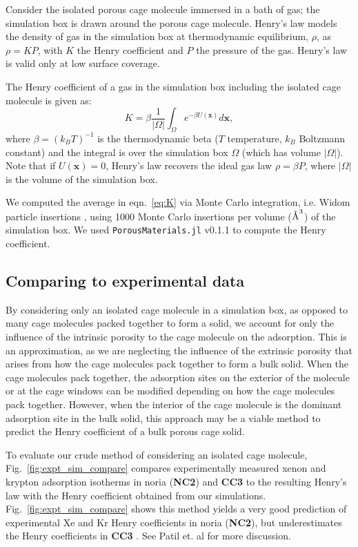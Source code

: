 \documentclass[journal=jacsat,manuscript=article]{achemso}
\newcommand{\angstrom}{\mbox{\normalfont\AA}}
\begin{document}
Consider the isolated porous cage molecule immersed in a bath of gas; the simulation box is drawn around the porous cage molecule. Henry's law models the density of gas in the simulation box at thermodynamic equilibrium, $\rho $, as $\rho=K P$, with $K$ the Henry coefficient and $P$ the pressure of the gas. Henry's law is valid only at low surface coverage.

The Henry coefficient of a gas in the simulation box including the isolated cage molecule is given as:
\begin{equation}
K = \beta \frac{1}{|\Omega|} \int_\Omega e^{-\beta U(\mathbf{x})} d\mathbf{x},
\label{eq:K}
\end{equation} where $\beta= (k_B T)^{-1}$ is the thermodynamic beta ($T$ temperature, $k_B$ Boltzmann constant) and the integral is over the simulation box $\Omega$ (which has volume $|\Omega|$). Note that if $U(\mathbf{x})=0$, Henry's law recovers the ideal gas law $\rho = \beta P$, where $|\Omega|$ is the volume of the simulation box.

We computed the average in eqn.~\ref{eq:K} via Monte Carlo integration, i.e. Widom particle insertions \cite{frenkel2001understanding}, using 1000 Monte Carlo insertions per volume ($\angstrom^3$) of the simulation box. We used \texttt{PorousMaterials.jl} v0.1.1 \cite{PorousMaterialsJL} to compute the Henry coefficient.

\subsection{Comparing to experimental data}
\label{sec:kh_isolated}
By considering only an isolated cage molecule in a simulation box, as opposed to many cage molecules packed together to form a solid, we account for only the influence of the intrinsic porosity to the cage molecule on the adsorption. This is an approximation, as we are neglecting the influence of the extrinsic porosity that arises from how the cage molecules pack together to form a bulk solid. When the cage molecules pack together, the adsorption sites on the exterior of the molecule or at the cage windows can be modified depending on how the cage molecules pack together. However, when the interior of the cage molecule is the dominant adsorption site in the bulk solid, this approach may be a viable method to predict the Henry coefficient of a bulk porous cage solid.

To evaluate our crude method of considering an isolated cage molecule, Fig.~\ref{fig:expt_sim_compare} compares experimentally measured xenon and krypton adsorption isotherms in noria \cite{patil2016noria} (\textbf{NC2}) and \textbf{CC3} \cite{chen2014separation} to the resulting Henry's law with the Henry coefficient obtained from our simulations. Fig.~\ref{fig:expt_sim_compare} shows this method yields a very good prediction of experimental Xe and Kr Henry coefficients in noria \cite{patil2016noria} (\textbf{NC2}), but underestimates the Henry coefficients in \textbf{CC3} \cite{chen2014separation}. See Patil et. al \cite{patil2016noria} for more discussion.
\end{document}

